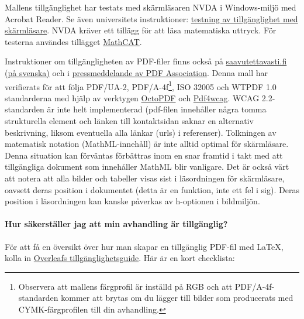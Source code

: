 \documentclass[swedish, manual, a4paper]{csthesis}
\begin{document}
Mallens tillgänglighet har testats med skärmläsaren NVDA i Windows-miljö med Acrobat Reader. Se även universitets instruktioner: \href{https://helpdesk.it.helsinki.fi/help/20057}{testning av tillgänglighet med skärmläsare}. NVDA kräver ett tillägg för att läsa matematiska uttryck. För testerna användes tillägget \href{https://addons.nvda-project.org/addons/MathCAT.en.html}{MathCAT}.


Instruktioner om tillgängligheten av PDF-filer finns också på \href{https://www.saavutettavasti.fi/sv/tillgangliga-dokument/pdf/}{saavutettavasti.fi (på svenska)} och i \href{https://pdfa.org/accessible-math-in-pdf-finally}{pressmeddelande av PDF Association}.
Denna mall har verifierats för att följa PDF/UA-2, PDF/A-4f\footnote{Observera att mallens färgprofil är inställd på RGB och att PDF/A-4f-standarden kommer att brytas om du lägger till bilder som producerats med CYMK-färgprofilen till din avhandling.}, ISO 32005 och WTPDF 1.0 standarderna med hjälp av verktygen \href{https://octopdf.com}{OctoPDF} och \href{https://pdf4wcag.com}{Pdf4wcag}. 
WCAG 2.2-standarden är inte helt implementerad (pdf-filen innehåller några tomma strukturella element och länken till kontaktsidan saknar en alternativ beskrivning, liksom eventuella alla länkar (urls) i referenser). Tolkningen av matematisk notation (MathML-innehåll) är inte alltid optimal för skärmläsare. Denna situation kan förväntas förbättras inom en snar framtid i takt med att tillgängliga dokument som innehåller MathML blir vanligare. Det är också värt att notera att alla bilder och tabeller visas sist i läsordningen för skärmläsare, oavsett deras position i dokumentet (detta är en funktion, inte ett fel i sig). Deras position i läsordningen kan kanske påverkas av h-optionen i bildmiljön.


\paragraph{Hur säkerställer jag att min avhandling är tillgänglig?}

För att få en översikt över hur man skapar en tillgänglig PDF-fil med \LaTeX,
kolla in \href{https://docs.overleaf.com/writing-and-editing/creating-accessible-pdfs}{Overleafs tillgänglighetsguide}. Här är en kort checklista:
\end{document}
